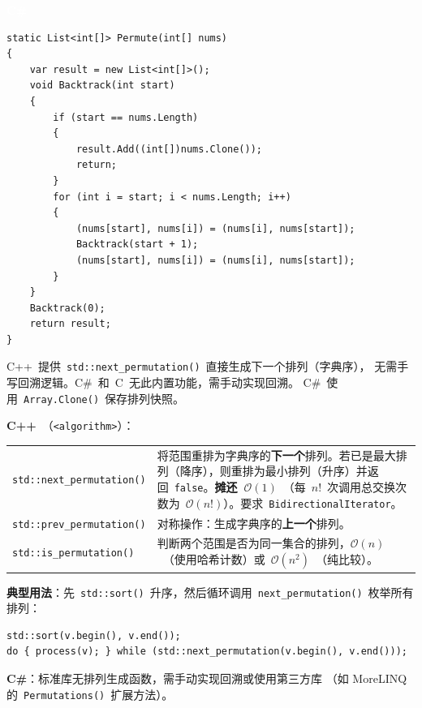 \documentclass[12pt,a4paper,fontset=fandol]{ctexbook}
\newcommand{\csharplabel}{%
  \noindent\begin{tcolorbox}[sharp corners,colback=csharpheadbg,colframe=csharpheadbg,
    left=6pt,right=6pt,top=2pt,bottom=2pt,boxrule=0pt]
  \textcolor{white}{\small\bfseries\sffamily C\#}\end{tcolorbox}%
}
\newcommand{\bigO}[1]{\mathcal{O}(#1)}
\newcommand{\header}[1]{\texttt{<#1>}}
\newcommand{\Fn}[1]{\texttt{#1()}}
\newcommand{\Tp}[1]{\texttt{#1}}
\begin{document}
\csharplabel
\begin{lstlisting}[style=csharpstyle]
static List<int[]> Permute(int[] nums)
{
    var result = new List<int[]>();
    void Backtrack(int start)
    {
        if (start == nums.Length)
        {
            result.Add((int[])nums.Clone());
            return;
        }
        for (int i = start; i < nums.Length; i++)
        {
            (nums[start], nums[i]) = (nums[i], nums[start]);
            Backtrack(start + 1);
            (nums[start], nums[i]) = (nums[i], nums[start]);
        }
    }
    Backtrack(0);
    return result;
}
\end{lstlisting}

\begin{compare}
C++~提供~\Fn{std::next\_permutation}~直接生成下一个排列（字典序），
无需手写回溯逻辑。C\#~和~C~无此内置功能，需手动实现回溯。
C\#~使用~\Tp{Array.Clone()}~保存排列快照。
\end{compare}

\begin{stdspec}[title=排列操作]
\textbf{C++}~（\header{algorithm}）：

\begin{tabularx}{\textwidth}{@{}l >{\raggedright\arraybackslash}X@{}}
  \Fn{std::next\_permutation} & 将范围重排为字典序的\textbf{下一个}排列。若已是最大排列（降序），则重排为最小排列（升序）并返回~\texttt{false}。\textbf{摊还~$\bigO{1}$}~（每~$n!$~次调用总交换次数为~$\bigO{n!}$）。要求~\Tp{BidirectionalIterator}。\\
  \Fn{std::prev\_permutation} & 对称操作：生成字典序的\textbf{上一个}排列。\\
  \Fn{std::is\_permutation} & 判断两个范围是否为同一集合的排列，$\bigO{n}$~（使用哈希计数）或~$\bigO{n^2}$~（纯比较）。\\
\end{tabularx}

\medskip
\textbf{典型用法}：先~\Fn{std::sort}~升序，然后循环调用~\Fn{next\_permutation}~枚举所有排列：
\begin{lstlisting}[style=cppstyle,numbers=none]
std::sort(v.begin(), v.end());
do { process(v); } while (std::next_permutation(v.begin(), v.end()));
\end{lstlisting}

\noindent\textbf{C\#}：标准库无排列生成函数，需手动实现回溯或使用第三方库
（如 MoreLINQ 的~\Fn{Permutations}~扩展方法）。
\end{stdspec}

\end{document}
